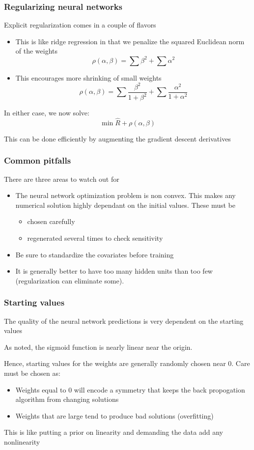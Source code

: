\documentclass[12pt]{beamer}
\begin{document}
\begin{frame}[fragile]
\frametitle{Regularizing neural networks}
Explicit regularization comes in a couple of flavors
\begin{itemize}
\item {} This is like ridge regression in that we penalize the squared
Euclidean norm of the weights
\[
\rho(\alpha,\beta) = \sum \beta^2 + \sum \alpha^2
\]
\item {} This encourages more shrinking of small weights
\[
\rho(\alpha,\beta) =  \sum \frac{\beta^2}{1+\beta^2} + \sum \frac{\alpha^2}{1 + \alpha^2}
\]
\end{itemize}

  In either case, we now solve:
\[
\min \hat{R} + \rho(\alpha,\beta) 
\]

This can be done efficiently by augmenting the gradient descent derivatives
\end{frame}

\begin{frame}[fragile]
\frametitle{Common pitfalls}
There are three areas to watch out for
\begin{itemize}
\item {} The neural network optimization problem is non convex.  This makes
any numerical solution highly dependant on the initial values.  These must be 
\begin{itemize}
\item chosen carefully
\item regenerated several times to check sensitivity
\end{itemize}
\item {} Be sure to standardize the covariates before training
\item {} It is generally better to have too many hidden units
than too few (regularization can eliminate some).  

\end{itemize}
\end{frame}


\begin{frame}[fragile]
\frametitle{Starting values}
The quality of the neural network predictions is very dependent on the starting values

\vsp
As noted, the sigmoid function is nearly linear near the origin. 

\vsp
Hence, starting values for the weights are generally randomly chosen near 0.  Care must be chosen as:
\begin{itemize}
\item Weights equal to 0 will encode a symmetry that keeps the back propogation algorithm from changing solutions
\item Weights that are large tend to produce bad solutions (overfitting)
\end{itemize}
\vsp
This is like putting a prior on linearity and demanding the data add any nonlinearity
\end{frame}
\end{document}
